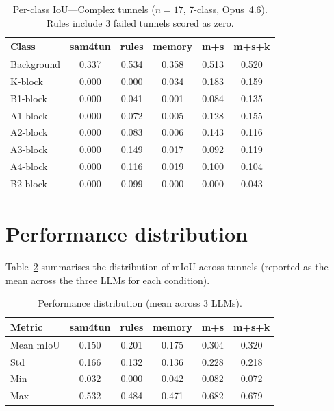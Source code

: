 \begin{table}[ht]
\caption{Per-class IoU---Complex tunnels ($n=17$, 7-class, Opus~4.6). Rules include 3 failed tunnels scored as zero.}\label{tab:perclass-complex}
\begin{tabular*}{\tblwidth}{@{} l c c c c c @{}}
\toprule
Class & sam4tun & rules & memory & m+s & m+s+k \\
\midrule
Background & 0.337 & 0.534 & 0.358 & 0.513 & 0.520 \\
K-block & 0.000 & 0.000 & 0.034 & 0.183 & 0.159 \\
B1-block & 0.000 & 0.041 & 0.001 & 0.084 & 0.135 \\
A1-block & 0.000 & 0.072 & 0.005 & 0.128 & 0.155 \\
A2-block & 0.000 & 0.083 & 0.006 & 0.143 & 0.116 \\
A3-block & 0.000 & 0.149 & 0.017 & 0.092 & 0.119 \\
A4-block & 0.000 & 0.116 & 0.019 & 0.100 & 0.104 \\
B2-block & 0.000 & 0.099 & 0.000 & 0.000 & 0.043 \\
\bottomrule
\end{tabular*}
\end{table}

\section{Performance distribution}\label{app:distribution}
Table~\ref{tab:distribution} summarises the distribution of mIoU across tunnels (reported as the mean across the three LLMs for each condition).

\begin{table}[ht]
\caption{Performance distribution (mean across 3 LLMs).}\label{tab:distribution}
\begin{tabular*}{\tblwidth}{@{} l c c c c c @{}}
\toprule
Metric & sam4tun & rules & memory & m+s & m+s+k \\
\midrule
Mean mIoU & 0.150 & 0.201 & 0.175 & 0.304 & 0.320 \\
Std & 0.166 & 0.132 & 0.136 & 0.228 & 0.218 \\
Min & 0.032 & 0.000 & 0.042 & 0.082 & 0.072 \\
Max & 0.532 & 0.484 & 0.471 & 0.682 & 0.679 \\
\bottomrule
\end{tabular*}
\end{table}
